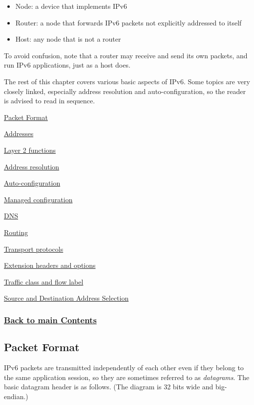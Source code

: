 \documentclass[
]{article}
\begin{document}
\begin{itemize}
\item
  Node: a device that implements IPv6
\item
  Router: a node that forwards IPv6 packets not explicitly addressed to
  itself
\item
  Host: any node that is not a router
\end{itemize}

To avoid confusion, note that a router may receive and send its own
packets, and run IPv6 applications, just as a host does.

The rest of this chapter covers various basic aspects of IPv6. Some
topics are very closely linked, especially address resolution and
auto-configuration, so the reader is advised to read in sequence.

\hyperref[packet-format]{Packet Format}

\hyperref[addresses]{Addresses}

\hyperref[layer-2-functions]{Layer 2 functions}

\hyperref[address-resolution]{Address resolution}

\hyperref[auto-configuration]{Auto-configuration}

\hyperref[managed-configuration]{Managed configuration}

\hyperref[dns]{DNS}

\hyperref[routing]{Routing}

\hyperref[transport-protocols]{Transport protocols}

\hyperref[extension-headers-and-options]{Extension headers and options}

\hyperref[traffic-class-and-flow-label]{Traffic class and flow label}

\hyperref[source-and-destination-address-selection]{Source and
Destination Address Selection}

\subsubsection{\texorpdfstring{\hyperref[list-of-contents]{Back to main
Contents}}{Back to main Contents}}\label{back-to-main-contents-1}

\pagebreak

\subsection{Packet Format}\label{packet-format}

IPv6 packets are transmitted independently of each other even if they
belong to the same application session, so they are sometimes referred
to as \emph{datagrams}. The basic datagram header is as follows. (The
diagram is 32 bits wide and big-endian.)
\end{document}
